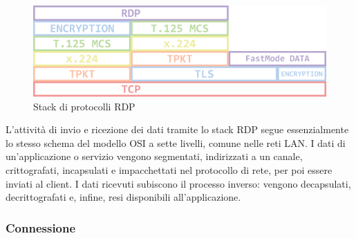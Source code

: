\documentclass[12pt,a4paper,openright,twoside]{book}
\begin{document}
\begin{figure}
    \centering
    \includegraphics[width=.5\linewidth]{figures/3-protocol_stack-768x239.png}
    \caption[xarch]{Stack di protocolli \ac{RDP} \footnotemark}
\end{figure}

L'attività di invio e ricezione dei dati tramite lo stack \ac{RDP} segue essenzialmente lo stesso schema del modello OSI a sette livelli,
comune nelle reti \ac{LAN}.
%
I dati di un'applicazione o servizio vengono segmentati,
indirizzati a un canale, crittografati,
incapsulati e impacchettati nel protocollo di rete, per poi essere inviati al client.
%
I dati ricevuti subiscono il processo inverso: vengono decapsulati, decrittografati e, infine, resi disponibili all'applicazione.

\subsubsection{Connessione}
\end{document}
